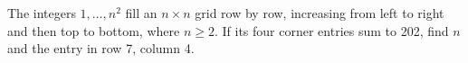 The integers $1,\ldots,n^2$ fill an $n\times n$ grid row by row, increasing from left to right and then top to bottom, where $n\ge2$. If its four corner entries sum to 202, find $n$ and the entry in row 7, column 4.
